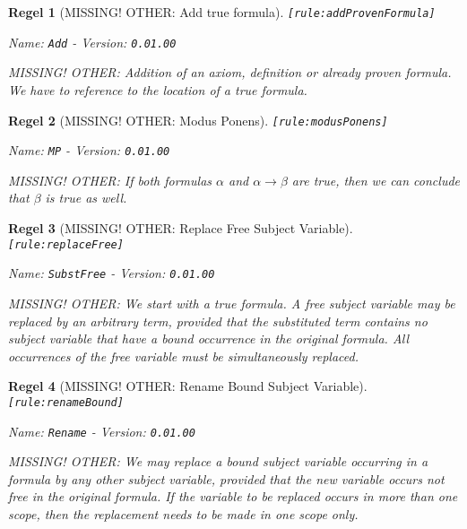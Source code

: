 \documentclass[a4paper,german,10pt,twoside]{book}
\newtheorem{rul}{Regel}
\theoremstyle{definition}
\theoremstyle{remark}
\begin{document}
\begin{rul}[MISSING! OTHER: Add true formula]
\label{rule:addProvenFormula} \hypertarget{rule:addProvenFormula}{}
{\tt \tiny [\verb]rule:addProvenFormula]]}

\par
{\em   Name: \verb]Add]  -  Version: \verb]0.01.00]}


MISSING! OTHER: Addition of an axiom, definition or already proven formula. We have to reference to the location of a true formula.
\end{rul}


\begin{rul}[MISSING! OTHER: Modus Ponens]
\label{rule:modusPonens} \hypertarget{rule:modusPonens}{}
{\tt \tiny [\verb]rule:modusPonens]]}

\par
{\em   Name: \verb]MP]  -  Version: \verb]0.01.00]}


MISSING! OTHER: If both formulas $\alpha$ and $\alpha \rightarrow \beta$ are true, then we can conclude that $\beta$ is true as well.
\end{rul}


\begin{rul}[MISSING! OTHER: Replace Free Subject Variable]
\label{rule:replaceFree} \hypertarget{rule:replaceFree}{}
{\tt \tiny [\verb]rule:replaceFree]]}

\par
{\em   Name: \verb]SubstFree]  -  Version: \verb]0.01.00]}


MISSING! OTHER: We start with a true formula.
A free subject variable may be replaced by an arbitrary term, provided that the substituted term contains no subject variable that have a bound occurrence in the original formula. All occurrences of the free variable must be simultaneously replaced.
\end{rul}


\begin{rul}[MISSING! OTHER: Rename Bound Subject Variable]
\label{rule:renameBound} \hypertarget{rule:renameBound}{}
{\tt \tiny [\verb]rule:renameBound]]}

\par
{\em   Name: \verb]Rename]  -  Version: \verb]0.01.00]}


MISSING! OTHER: We may replace a bound subject variable occurring in a formula by any other subject variable, provided that the new variable occurs not free in the original formula. If the variable to be replaced occurs in more than one scope, then the replacement needs to be made in one scope only.
\end{rul}
\end{document}
